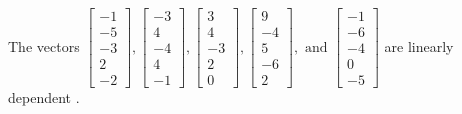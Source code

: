 \begin{exercise}
\begin{exerciseStatement}
  \end{exerciseStatement}
  \begin{exerciseAnswer}
   The vectors \(\left[\begin{array}{r}
-1 \\
-5 \\
-3 \\
2 \\
-2
\end{array}\right] , \left[\begin{array}{r}
-3 \\
4 \\
-4 \\
4 \\
-1
\end{array}\right] , \left[\begin{array}{r}
3 \\
4 \\
-3 \\
2 \\
0
\end{array}\right] , \left[\begin{array}{r}
9 \\
-4 \\
5 \\
-6 \\
2
\end{array}\right] , \text{ and } \left[\begin{array}{r}
-1 \\
-6 \\
-4 \\
0 \\
-5
\end{array}\right]\) are 
  	 linearly dependent  .
  


  \end{exerciseAnswer}
\end{exercise}